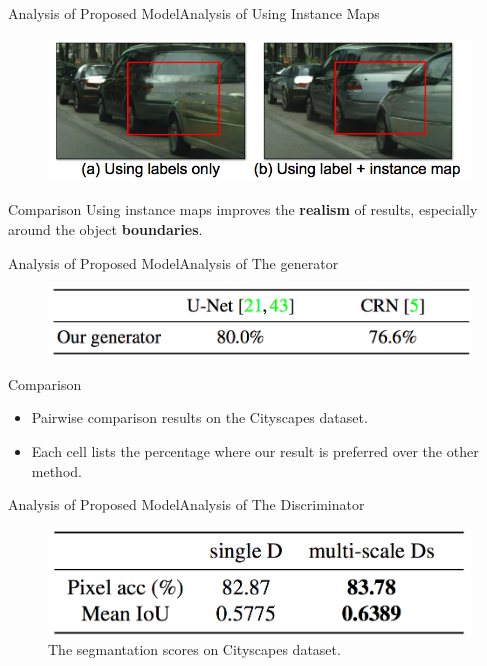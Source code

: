 \documentclass{beamer}
\begin{document}
\begin{frame}{Analysis of Proposed Model}{Analysis of  Using Instance Maps}
\begin{figure}
	\centering
	\includegraphics[height=0.45\textheight]{images/instance_result}
\end{figure}
%
%
\begin{beamerboxesrounded}[upper=uppercol,lower=lowercol,shadow=false]{Comparison }
Using instance maps improves the \textbf{realism} of  results, especially around the object \textbf{boundaries}.
\end{beamerboxesrounded}
\end{frame}

\begin{frame}{Analysis of Proposed Model}{Analysis of  The generator}
\begin{figure}
	\centering
	\includegraphics[height=0.2\textheight]{images/table_3}
\end{figure}
%
%
\begin{beamerboxesrounded}[upper=uppercol,lower=lowercol,shadow=false]{Comparison }
	\begin{itemize}
		\item
Pairwise comparison results on the Cityscapes dataset.
\item
 Each cell lists the percentage where our result is preferred over the other method.
 \end{itemize}
\end{beamerboxesrounded}
\end{frame}

\begin{frame}{Analysis of Proposed Model}{Analysis of The Discriminator}
\begin{figure}
	\centering
	\includegraphics[height=0.3\textheight]{images/table_4}
	\caption{The segmantation scores on Cityscapes dataset.}
\end{figure}

\end{frame}
\end{document}
